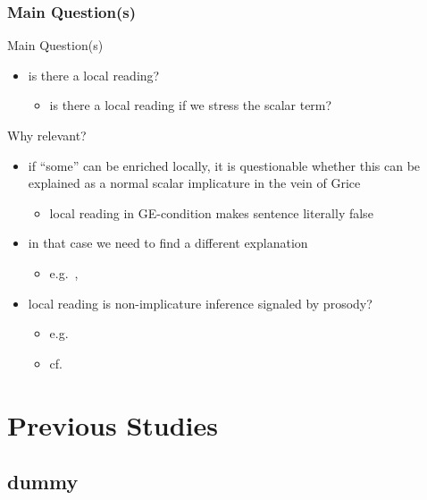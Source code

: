 \documentclass[fleqn,10pt,xcolor=dvipsnames]{beamer}
\newcommand{\GE}{GE\xspace}
\begin{document}
\begin{frame}
  \frametitle{Main Question(s)}
  \begin{block}{Main Question(s)}
    \begin{itemize}
    \item is there a local reading?
      \begin{itemize}
      \item is there a local reading if we stress the scalar
        term?
      \end{itemize}
    \end{itemize}
  \end{block}

  \begin{block}{Why relevant?}
    \begin{itemize}
    \item if ``some'' can be enriched locally, it is questionable
      whether this can be explained as a normal scalar implicature in
      the vein of Grice
      \begin{itemize}
        \item local reading in \GE-condition makes sentence literally false
      \end{itemize}
    \item in that case we need to find a different explanation
      \begin{itemize}
       \item e.g.~\citet{Chierchia:2004_ScalarImplicatures},  \citet{ChierchiaFox2008:The-Grammatical}
      \end{itemize}
    \item local reading is non-implicature inference signaled by
      prosody?
      \begin{itemize}
      \item e.g.~\citet{Geurts2010:Quantity-Implic}
      \item cf.~\citet{SchwarzClifton2008:Strengthening-o}
      \end{itemize}
    \end{itemize}
  \end{block}
\end{frame}

\section{Previous Studies}
\subsection{dummy}
\end{document}
